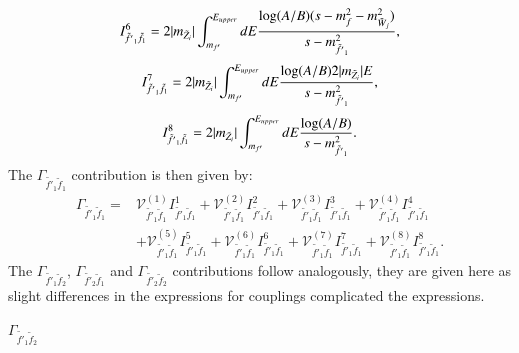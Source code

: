 \documentclass[final,3p,times]{elsarticle}
\begin{document}
\begin{equation}
\begin{aligned}
I_{\tilde{f'}_1 \tilde{f}_1}^{6} = 2|m_{\tilde{Z}_i}| \int_{m_{f'}}^{E_{upper}} dE {\log(A/B) (s-m_{f}^2 - m_{\tilde{W}_j}^2)  \over s - m_{\tilde{f'}_1}^2},
\end{aligned}
\end{equation}
\begin{equation}
\begin{aligned}
I_{\tilde{f'}_1 \tilde{f}_1}^{7} = 2|m_{\tilde{Z}_i}| \int_{m_{f'}}^{E_{upper}} dE {\log(A/B) 2|m_{\tilde{Z}_i}|E  \over s - m_{\tilde{f'}_1}^2},
\end{aligned}
\end{equation}
\begin{equation}
\begin{aligned}
I_{\tilde{f'}_1 \tilde{f}_1}^{8} = 2|m_{\tilde{Z}_i}| \int_{m_{f'}}^{E_{upper}} dE {\log(A/B) \over s - m_{\tilde{f'}_1}^2}.
\end{aligned}
\end{equation}
The $\Gamma_{\tilde{f'}_1 \tilde{f}_1}$ contribution is then given by:
\begin{equation}
\begin{aligned}
\Gamma_{\tilde{f'}_1 \tilde{f}_1} = & \mathcal{V}_{\tilde{f'}_1 \tilde{f}_1}^{(1)} I_{\tilde{f'}_1 \tilde{f}_1}^{1} + \mathcal{V}_{\tilde{f'}_1 \tilde{f}_1}^{(2)} I_{\tilde{f'}_1 \tilde{f}_1}^{2} + \mathcal{V}_{\tilde{f'}_1 \tilde{f}_1}^{(3)} I_{\tilde{f'}_1 \tilde{f}_1}^{3} + \mathcal{V}_{\tilde{f'}_1 \tilde{f}_1}^{(4)} I_{\tilde{f'}_1 \tilde{f}_1}^{4} \\ & + \mathcal{V}_{\tilde{f'}_1 \tilde{f}_1}^{(5)} I_{\tilde{f'}_1 \tilde{f}_1}^{5} + \mathcal{V}_{\tilde{f'}_1 \tilde{f}_1}^{(6)} I_{\tilde{f'}_1 \tilde{f}_1}^{6} + \mathcal{V}_{\tilde{f'}_1 \tilde{f}_1}^{(7)} I_{\tilde{f'}_1 \tilde{f}_1}^{7} + \mathcal{V}_{\tilde{f'}_1 \tilde{f}_1}^{(8)} I_{\tilde{f'}_1 \tilde{f}_1}^{8}.
\end{aligned}
\end{equation}
The $\Gamma_{\tilde{f'}_1 \tilde{f}_2}$, $\Gamma_{\tilde{f'}_2 \tilde{f}_1}$ and $\Gamma_{\tilde{f'}_2 \tilde{f}_2}$ contributions follow analogously, they are given here as slight differences in the expressions for couplings complicated the expressions.

\textbf{\underline{$\Gamma_{\tilde{f'}_1 \tilde{f}_2}$}}
\end{document}
